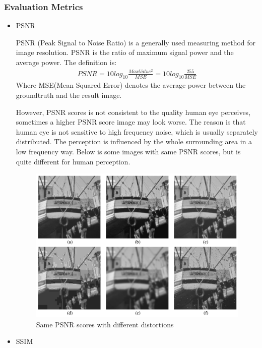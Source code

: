 \documentclass{article}
\begin{document}
  \subsubsection*{Evaluation Metrics}
  \begin{itemize}
      \item PSNR 
      
      PSNR (Peak Signal to Noise Ratio) is a generally used measuring method for image resolution.
      PSNR is the ratio of maximum signal power and the average power.
      The definition is:
      \begin{align*}
          PSNR = 10log_{10}\frac{MaxValue^2}{MSE} = 10log_{10}\frac{255}{MSE}
      \end{align*}
      Where MSE(Mean Squared Error) denotes the average power between the groundtruth and the result image.
  
      However, PSNR scores is not consistent to the quality human eye perceives, sometimes a higher PSNR score image may look worse.
      The reason is that human eye is not sensitive to high frequency noise, which is usually separately distributed. 
      The perception is influenced by the whole surrounding area in a low frequency way.
      Below is some images with same PSNR scores, but is quite different for human perception. 
      \begin{figure}[H]
          \centering
          \includegraphics[scale = 0.3]{images/PSNR.png}
          \caption{Same PSNR scores with different distortions}
      \end{figure}
  
      \item SSIM
      

\end{itemize}
\end{document}
